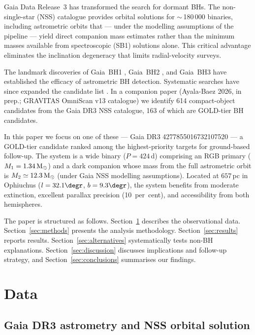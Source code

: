 \documentclass[usenatbib,fleqn]{mnras}
\newcommand{\Msun}{{\rm M}_\odot}
\begin{document}
Gaia Data Release~3 \citep[DR3;][]{GaiaCollaboration2023} has
transformed the search for dormant BHs.  The non-single-star (NSS)
catalogue \citep{GaiaNSS2023} provides orbital solutions for
$\sim$\,180\,000 binaries, including astrometric orbits that ---
under the modelling assumptions of the pipeline --- yield direct
companion mass estimates rather than the minimum masses
available from spectroscopic (SB1) solutions alone.  This critical
advantage eliminates the inclination degeneracy that limits
radial-velocity surveys.

The landmark discoveries of Gaia~BH1
\citep[$M_2 \approx 9.6\,\Msun$;][]{ElBadry2023a}, Gaia~BH2
\citep[$M_2 \approx 8.9\,\Msun$;][]{ElBadry2023b}, and Gaia~BH3
\citep[$M_2 \approx 33\,\Msun$;][]{GaiaBH3_2024} have established
the efficacy of astrometric BH detection.  Systematic searches
have since expanded the candidate list
\citep{Jayasinghe2021, Thompson2019, Shenar2022, Mahy2022}.  In a companion paper (Ayala-Baez 2026, in prep.;
GRAVITAS OmniScan v13 catalogue) we identify 614 compact-object
candidates from the Gaia DR3 NSS catalogue, 163 of which are
GOLD-tier BH candidates.

In this paper we focus on one of these --- Gaia DR3
4277855016732107520 --- a GOLD-tier candidate ranked among the
highest-priority targets for ground-based follow-up.  The system is
a wide binary ($P = 424$\,d) comprising an RGB primary
($M_1 = 1.34\,\Msun$) and a dark companion whose mass from
the full astrometric orbit is $M_2 \simeq 12.3\,\Msun$ (under Gaia
NSS modelling assumptions).  Located at
$657$\,pc in Ophiuchus ($l = 32.1\degr$, $b = 9.3\degr$), the
system benefits from moderate extinction, excellent parallax
precision (10~per~cent), and accessibility from both hemispheres.

The paper is structured as follows.  Section~\ref{sec:data}
describes the observational data.  Section~\ref{sec:methods}
presents the analysis methodology.  Section~\ref{sec:results}
reports results.  Section~\ref{sec:alternatives} systematically
tests non-BH explanations.  Section~\ref{sec:discussion} discusses
implications and follow-up strategy, and
Section~\ref{sec:conclusions} summarises our findings.

\section{Data}
\label{sec:data}

\subsection{Gaia DR3 astrometry and NSS orbital solution}
\label{sec:data:gaia}
\end{document}
